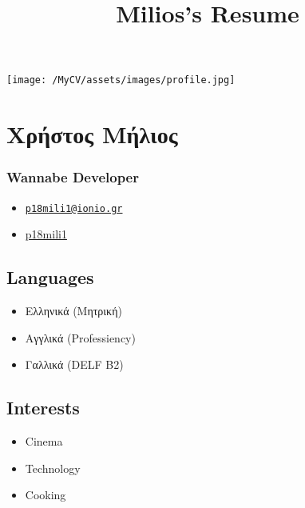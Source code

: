 \documentclass[english,]{article}
\title{Milios's Resume}
\date{}
\providecommand{\tightlist}{%
  \setlength{\itemsep}{0pt}\setlength{\parskip}{0pt}}
\begin{document}
\maketitle

\texttt{[image: /MyCV/assets/images/profile.jpg]}

\hypertarget{ux3c7ux3c1ux3aeux3c3ux3c4ux3bfux3c2-ux3bcux3aeux3bbux3b9ux3bfux3c2}{%
\section{Χρήστος
Μήλιος}\label{ux3c7ux3c1ux3aeux3c3ux3c4ux3bfux3c2-ux3bcux3aeux3bbux3b9ux3bfux3c2}}

\hypertarget{wannabe-developer}{%
\subsubsection{Wannabe Developer}\label{wannabe-developer}}

\begin{itemize}
\tightlist
\item
  \emph{} \href{mailto:p18mili1@ionio.gr}{\nolinkurl{p18mili1@ionio.gr}}
\item
  \emph{} \href{http://github.com/p18mili1}{p18mili1}
\end{itemize}

\hypertarget{languages}{%
\subsection{Languages}\label{languages}}

\begin{itemize}
\tightlist
\item
  Ελληνικά {(Μητρική)}
\item
  Αγγλικά {(Professiency)}
\item
  Γαλλικά {(DELF B2)}
\end{itemize}

\hypertarget{interests}{%
\subsection{Interests}\label{interests}}

\begin{itemize}
\tightlist
\item
  Cinema
\item
  Technology
\item
  Cooking
\end{itemize}
\end{document}
